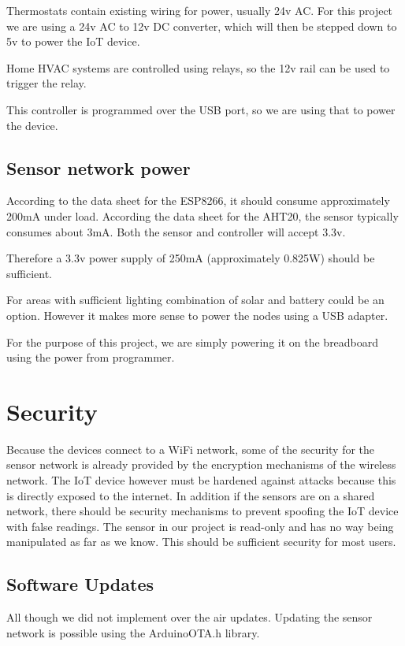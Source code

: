 \documentclass[10pt, journal]{IEEEtran} %
\begin{document}
Thermostats contain existing wiring for power, usually 24v AC.
For this project we are using a 24v AC to 12v DC converter, 
which will then be stepped down to 5v to power the IoT device.

Home HVAC systems are controlled using relays,
so the 12v rail can be used to trigger the relay.

This controller is programmed over the USB port,
so we are using that to power the device.

\subsection{Sensor network power}

According to the data sheet for the ESP8266, it should consume approximately 200mA under load.
According the data sheet for the AHT20, the sensor typically consumes about 3mA.
Both the sensor and controller will accept 3.3v.

Therefore a 3.3v power supply of 250mA (approximately 0.825W) should be sufficient.

For areas with sufficient lighting combination of solar and battery could be an option.
However it makes more sense to power the nodes using a USB adapter.

For the purpose of this project, 
we are simply powering it on the breadboard using the power from programmer.


\section{Security}

Because the devices connect to a WiFi network,
some of the security for the sensor network is already provided by 
the encryption mechanisms of the wireless network.
The IoT device however must be hardened against attacks because this is directly exposed to the internet.
In addition if the sensors are on a shared network, 
there should be security mechanisms to prevent spoofing the IoT device with false readings.
The sensor in our project is read-only and has no way being manipulated as far as we know.
This should be sufficient security for most users.


\subsection{Software Updates}

All though we did not implement over the air updates.
Updating the sensor network is possible using the ArduinoOTA.h library.
\end{document}

